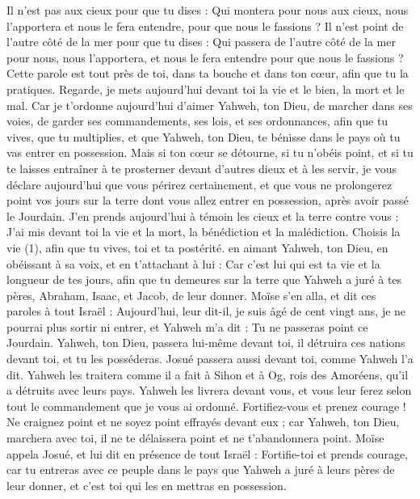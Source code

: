 \begin{multicols}{2}
Il n'est pas aux cieux pour que tu dises : Qui montera pour nous aux cieux, nous l’apportera et nous le fera entendre, pour que nous le fassions ?
Il n'est point de l’autre côté de la mer pour que tu dises : Qui passera de l’autre côté de la mer pour nous, nous l’apportera, et nous le fera entendre pour que nous le fassions ?
Cette parole est tout près de toi, dans ta bouche et dans ton cœur, afin que tu la pratiques.
Regarde, je mets aujourd'hui devant toi la vie et le bien, la mort et le mal.
Car je t’ordonne aujourd'hui d'aimer Yahweh, ton Dieu, de marcher dans ses voies, de garder ses commandements, ses lois, et ses ordonnances, afin que tu vives, que tu multiplies, et que Yahweh, ton Dieu, te bénisse dans le pays où tu vas entrer en possession.
Mais si ton cœur se détourne, si tu n'obéis point, et si tu te laisses entraîner à te prosterner devant d'autres dieux et à les servir,
je vous déclare aujourd'hui que vous périrez certainement, et que vous ne prolongerez point vos jours sur la terre dont vous allez entrer en possession, après avoir passé le Jourdain.
J’en prends aujourd'hui à témoin les cieux et la terre contre vous : J'ai mis devant toi la vie et la mort, la bénédiction et la malédiction. Choisis la vie (1), afin que tu vives, toi et ta postérité.
en aimant Yahweh, ton Dieu, en obéissant à sa voix, et en t'attachant à lui : Car c’est lui qui est ta vie et la longueur de tes jours, afin que tu demeures sur la terre que Yahweh a juré à tes pères, Abraham, Isaac, et Jacob, de leur donner.
\VerseOne{}Moïse s'en alla, et dit ces paroles à tout Israël :
Aujourd’hui, leur dit-il, je suis âgé de cent vingt ans, je ne pourrai plus sortir ni entrer, et Yahweh m'a dit : Tu ne passeras point ce Jourdain.
Yahweh, ton Dieu, passera lui-même devant toi, il détruira ces nations devant toi, et tu les posséderas. Josué passera aussi devant toi, comme Yahweh l’a dit.
Yahweh les traitera comme il a fait à Sihon et à Og, rois des Amoréens, qu’il a détruits avec leurs pays.
Yahweh les livrera devant vous, et vous leur ferez selon tout le commandement que je vous ai ordonné.
Fortifiez-vous et prenez courage ! Ne craignez point et ne soyez point effrayés devant eux ; car Yahweh, ton Dieu, marchera avec toi, il ne te délaissera point et ne t'abandonnera point.
Moïse appela Josué, et lui dit en présence de tout Israël : Fortifie-toi et prends courage, car tu entreras avec ce peuple dans le pays que Yahweh a juré à leurs pères de leur donner, et c'est toi qui les en mettras en possession.

\end{multicols}
